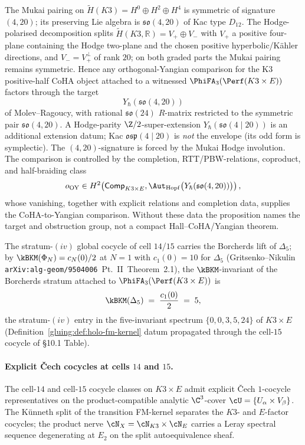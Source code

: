 \begin{proposition}
\label{gluing:prop:super-yangian-emergence}
The Mukai pairing on
$\widetilde H(K3)=H^{0}\oplus H^{2}\oplus H^{4}$ is symmetric of
signature $(4, 20)$; its preserving Lie algebra is
$\mathfrak{so}(4, 20)$ of Kac type $D_{12}$. The Hodge-polarised
decomposition splits \(\widetilde H(K3,\mathbb{R})=V_+\oplus V_-\) with
\(V_+\) a positive four-plane containing the Hodge two-plane and the
chosen positive hyperbolic/K\"ahler directions, and \(V_-=V_+^\perp\) of
rank \(20\); on both graded parts the Mukai pairing remains symmetric.
Hence any orthogonal-Yangian
comparison for the K$3$ positive-half CoHA object attached to a
witnessed \(\PhiFA_3(\Perf(K3 \times E))\) factors through the target
\[
Y_\hbar(\mathfrak{so}(4, 20))
\]
of Molev--Ragoucy, with rational $\mathfrak{so}(24)$ $R$-matrix
restricted to the symmetric pair $\mathfrak{so}(4, 20)$. A Hodge-parity
$\Z/2$-super-extension
$Y_\hbar(\mathfrak{so}(4 \mid 20))$ is an additional extension datum;
Kac $\mathfrak{osp}(4 \mid 20)$ is \emph{not} the envelope (its odd
form is symplectic). The $(4, 20)$-signature is forced by the Mukai
Hodge involution. The comparison is controlled by the
completion, RTT/PBW-relations, coproduct, and half-braiding class
\[
 o_{\mathrm{OY}}\in
 H^2\!\left(
 \mathsf{Comp}_{K3\times E},
 \Aut_{\mathrm{Hopf}}\bigl(Y_\hbar(\mathfrak{so}(4,20))\bigr)
 \right),
\]
whose vanishing, together with explicit relations and completion data,
supplies the CoHA-to-Yangian comparison. Without these data the
proposition names the target and obstruction group, not a compact
Hall--CoHA/Yangian theorem.
\end{proposition}

The stratum-$(iv)$ global cocycle of cell $14$/$15$ carries the
Borcherds lift of $\Delta_{5}$; by
$\kBKM(\Phi_{N})=c_{N}(0)/2$ at $N=1$ with $c_{1}(0)=10$ for
$\Delta_{5}$ (Gritsenko--Nikulin
\texttt{arXiv:alg-geom/9504006}~Pt.~II~Theorem~2.1), the
$\kBKM$-invariant of the Borcherds stratum attached to
$\PhiFA_{3}(\Perf(K3\times E))$ is
\[
\kBKM(\Delta_{5})\;=\;\frac{c_{1}(0)}{2}\;=\;5,
\]
the stratum-$(iv)$ entry in the five-invariant spectrum
$\{0,0,3,5,24\}$ of $K3\times E$
(Definition~\ref{gluing:def:holo-fm-kernel} datum propagated through
the cell-$15$ cocycle of \S 10.1 Table).

\paragraph{Explicit \v{C}ech cocycles at cells $14$ and $15$.} The
cell-$14$ and cell-$15$ cocycle classes on $K3 \times E$ admit
explicit \v{C}ech $1$-cocycle representatives on the
product-compatible analytic $\C^{3}$-cover
$\cU = \{U_{\alpha}\times V_{\beta}\}$. The K\"{u}nneth split of the
transition FM-kernel separates the $K3$- and $E$-factor cocycles; the
product nerve $\cN_{X} = \cN_{K3}\times\cN_{E}$ carries a Leray
spectral sequence degenerating at $E_{2}$ on the split autoequivalence
sheaf.

